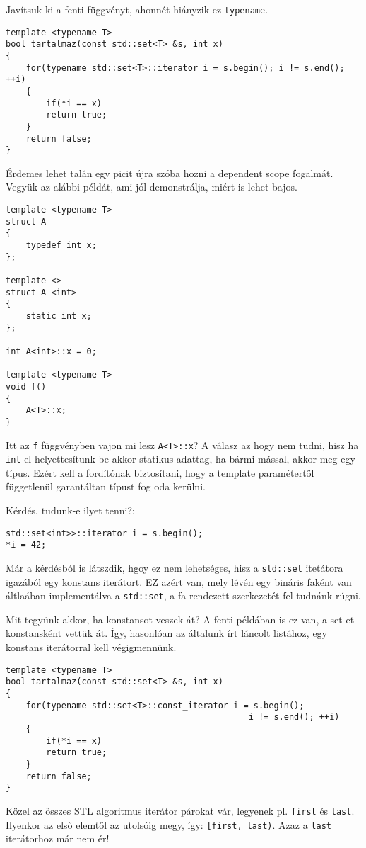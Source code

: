 \documentclass[a4paper,11.5pt]{article}
\begin{document}
	\medskip
	Javítsuk ki a fenti függvényt, ahonnét hiányzik ez \texttt{typename}.
\begin{lstlisting}
template <typename T>
bool tartalmaz(const std::set<T> &s, int x)
{
	for(typename std::set<T>::iterator i = s.begin(); i != s.end(); ++i)
	{
		if(*i == x)
		return true;
	}
	return false;
}
\end{lstlisting}

	Érdemes lehet talán egy picit újra szóba hozni a dependent scope fogalmát. Vegyük az alábbi példát, ami jól demonstrálja, miért is lehet bajos.
\begin{lstlisting}
template <typename T>
struct A
{
	typedef int x;
};

template <>
struct A <int>
{
	static int x;
};

int A<int>::x = 0;

template <typename T>
void f()
{
	A<T>::x;
}
\end{lstlisting}
	Itt az \texttt{f} függvényben vajon mi lesz \texttt{A<T>::x}? A válasz az hogy nem tudni, hisz ha \texttt{int}-el helyettesítunk be akkor statikus adattag, ha bármi mással, akkor meg egy típus. Ezért kell a fordítónak biztosítani, hogy a template paramétertől függetlenül garantáltan típust fog oda kerülni.
	
	\medskip
	Kérdés, tudunk-e ilyet tenni?:
\begin{lstlisting}
std::set<int>>::iterator i = s.begin();
*i = 42;
\end{lstlisting}
	Már a kérdésból is látszdik, hgoy ez nem lehetséges, hisz a \texttt{std::set} itetátora igazából egy konstans iterátort. EZ azért van, mely lévén egy bináris faként van áltlaában implementálva a \texttt{std::set}, a fa rendezett szerkezetét fel tudnánk rúgni.
	
	\smallskip
	Mit tegyünk akkor, ha konstansot veszek át? A fenti példában is ez van, a set-et konstansként vettük át. Így, hasonlóan az általunk írt láncolt listához, egy konstans iterátorral kell végigmennünk.
\begin{lstlisting}
template <typename T>
bool tartalmaz(const std::set<T> &s, int x)
{
	for(typename std::set<T>::const_iterator i = s.begin(); 
												i != s.end(); ++i)
	{
		if(*i == x)
		return true;
	}
	return false;
}
\end{lstlisting}
	
	\medskip
	Közel az összes STL algoritmus iterátor párokat vár, legyenek pl. \texttt{first} és \texttt{last}. Ilyenkor az első elemtől az utolsóig megy, így: \texttt{[first, last)}. Azaz a \texttt{last} iterátorhoz már nem ér!
	\smallskip
	
\end{document}
